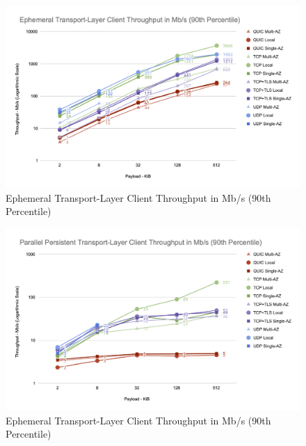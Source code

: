 \begin{figure}[h!]
    \centering
    \includegraphics[width=\linewidth]{figures/charts/Ephemeral Transport-Layer Client Throughput in Mb_s (90th Percentile).png}
    \caption{Ephemeral Transport-Layer Client Throughput in Mb/s (90th Percentile)}
    \label{fig:ephemeral_transport_throughput}
\end{figure}

\begin{figure}[h!]
    \centering
    \includegraphics[width=\linewidth]{figures/charts/Parallel Persistent Transport-Layer Client Throughput in Mb_s (90th Percentile).png}
    \caption{Ephemeral Transport-Layer Client Throughput in Mb/s (90th Percentile)}
    \label{fig:parallel_transport_throughput}
\end{figure}
